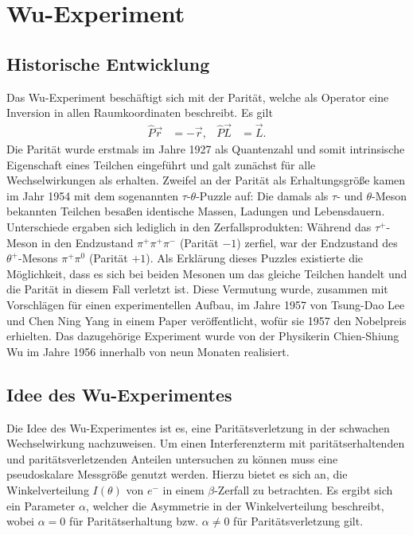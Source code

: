 
\section{Wu-Experiment}


\subsection{Historische Entwicklung}
Das Wu-Experiment beschäftigt sich mit der Parität, welche als Operator eine Inversion in allen Raumkoordinaten beschreibt. Es gilt
\begin{align*}
	\hat{P} \vec{r} &= -\vec{r}, &
	\hat{P} \vec{L} &= \vec{L}.
\end{align*}
Die Parität wurde erstmals im Jahre 1927 als Quantenzahl und somit intrinsische Eigenschaft eines Teilchen eingeführt und galt zunächst für alle Wechselwirkungen als erhalten.
Zweifel an der Parität als Erhaltungsgröße kamen im Jahr 1954 mit dem sogenannten $\tau$-$\theta$-Puzzle auf:
Die damals als $\tau$- und $\theta$-Meson bekannten Teilchen besaßen identische Massen, Ladungen und Lebensdauern.
Unterschiede ergaben sich lediglich in den Zerfallsprodukten:
Während das $\tau^+$-Meson in den Endzustand $\pi^+ \pi^+ \pi^-$ (Parität $-1$) zerfiel, war der Endzustand des $\theta^+$-Mesons $\pi^+ \pi^0$ (Parität $+1$).
Als Erklärung dieses Puzzles existierte die Möglichkeit, dass es sich bei beiden Mesonen um das gleiche Teilchen handelt und die Parität in diesem Fall verletzt ist.
Diese Vermutung wurde, zusammen mit Vorschlägen für einen experimentellen Aufbau, im Jahre 1957 von Tsung-Dao Lee und Chen Ning Yang in einem Paper veröffentlicht, wofür sie 1957 den Nobelpreis erhielten.
Das dazugehörige Experiment wurde von der Physikerin Chien-Shiung Wu im Jahre 1956 innerhalb von neun Monaten realisiert.

\subsection{Idee des Wu-Experimentes}
Die Idee des Wu-Experimentes ist es, eine Paritätsverletzung in der schwachen Wechselwirkung nachzuweisen.
Um einen Interferenzterm mit paritätserhaltenden und paritätsverletzenden Anteilen untersuchen zu können muss eine pseudoskalare Messgröße genutzt werden.
Hierzu bietet es sich an, die Winkelverteilung $I\left(\theta \right)$ von $e^-$ in einem $\beta$-Zerfall zu betrachten. 
Es ergibt sich ein Parameter $\alpha$, welcher die Asymmetrie in der Winkelverteilung beschreibt, wobei $\alpha = 0$ für Paritätserhaltung bzw. $\alpha \neq 0$ für Paritätsverletzung gilt.

